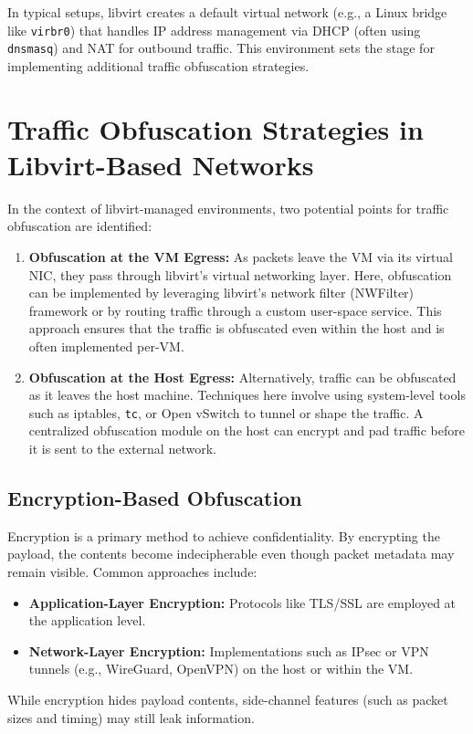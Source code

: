 \documentclass{article}
\begin{document}
In typical setups, libvirt creates a default virtual network (e.g., a Linux bridge like \texttt{virbr0}) that handles IP address management via DHCP (often using \texttt{dnsmasq}) and NAT for outbound traffic. This environment sets the stage for implementing additional traffic obfuscation strategies.

\section{Traffic Obfuscation Strategies in Libvirt-Based Networks}
In the context of libvirt-managed environments, two potential points for traffic obfuscation are identified:
\begin{enumerate}[label=\arabic*.]
    \item \textbf{Obfuscation at the VM Egress:} As packets leave the VM via its virtual NIC, they pass through libvirt’s virtual networking layer. Here, obfuscation can be implemented by leveraging libvirt’s network filter (NWFilter) framework or by routing traffic through a custom user-space service. This approach ensures that the traffic is obfuscated even within the host and is often implemented per-VM.
    \item \textbf{Obfuscation at the Host Egress:} Alternatively, traffic can be obfuscated as it leaves the host machine. Techniques here involve using system-level tools such as iptables, \texttt{tc}, or Open vSwitch to tunnel or shape the traffic. A centralized obfuscation module on the host can encrypt and pad traffic before it is sent to the external network.
\end{enumerate}

\subsection{Encryption-Based Obfuscation}
Encryption is a primary method to achieve confidentiality. By encrypting the payload, the contents become indecipherable even though packet metadata may remain visible. Common approaches include:
\begin{itemize}[noitemsep]
    \item \textbf{Application-Layer Encryption:} Protocols like TLS/SSL are employed at the application level.
    \item \textbf{Network-Layer Encryption:} Implementations such as IPsec or VPN tunnels (e.g., WireGuard, OpenVPN) on the host or within the VM.
\end{itemize}
While encryption hides payload contents, side-channel features (such as packet sizes and timing) may still leak information.
\end{document}
